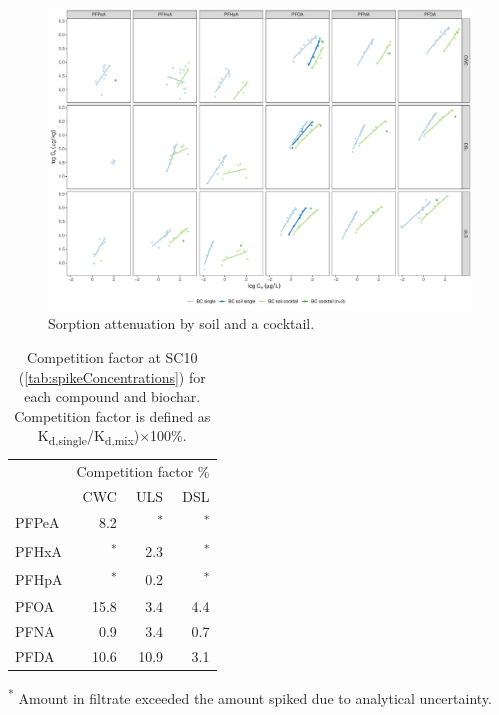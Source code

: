 \begin{figure}[htb]
    \centering
    \includegraphics[width=\textwidth]{R/figs/Attenuation.pdf}
    \caption{Sorption attenuation by soil and a cocktail.}
    \label{fig:attenuation}
\end{figure}

\begin{table}
\centering
\caption{Competition factor at SC10 (\cref{tab:spikeConcentrations}) for each compound and biochar. Competition factor is defined as K\textsubscript{d,single}/K\textsubscript{d,mix})$\times$100\%.}
\begin{threeparttable}
\label{tab:competition}
\begin{tabular}{lrrr}
\toprule
 & \multicolumn{3}{c}{Competition factor \%} \\ \cmidrule(l){2-4}
 & CWC & ULS & DSL \\ \midrule
PFPeA & 8.2 & \textsuperscript{*} & \textsuperscript{*} \\
PFHxA & \textsuperscript{*} & 2.3 & \textsuperscript{*} \\
PFHpA & \textsuperscript{*} & 0.2 & \textsuperscript{*} \\
PFOA & 15.8 & 3.4 & 4.4 \\
PFNA & 0.9 & 3.4 & 0.7 \\
PFDA & 10.6 & 10.9 & 3.1 \\ \bottomrule
\end{tabular}
\begin{tablenotes}
\item \textsuperscript{*} Amount in filtrate exceeded the amount spiked due to analytical uncertainty.
\end{tablenotes}
\end{threeparttable}
\end{table}

